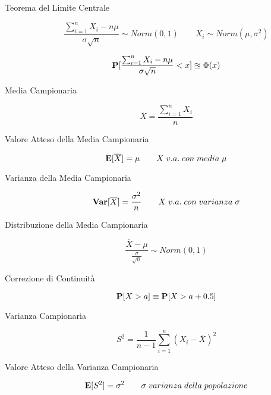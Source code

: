 \begin{description}
	
	\item[Teorema del Limite Centrale]
	\begin{equation}
	\frac{\sum_{i=1}^{n} X_{i} - n\mu}{\sigma\sqrt{n}} \sim Norm(0,1) \qquad X_{i} \sim Norm(\mu,\sigma^{2}) 
	\end{equation}
	
	\begin{equation}
	\mathbf{P}[\frac{\sum_{i=1}^{n} X_{i} - n\mu}{\sigma\sqrt{n}} < x] \approxeq \Phi(x)
	\end{equation}
	
	\item[Media Campionaria]
	\begin{equation}
	\overline{X} = \frac{\sum_{i=1}^{n} X_{i}}{n}
	\end{equation}
	
	\item[Valore Atteso della Media Campionaria]
	\begin{equation}
	\mathbf{E}[\overline{X}] = \mu \qquad X \; v.a. \; con \; media \; \mu
	\end{equation}
	
	\item[Varianza della Media Campionaria]
	\begin{equation}
	\mathbf{Var}[\overline{X}] = \frac{\sigma^{2}}{n} \qquad X \; v.a. \; con \; varianza \; \sigma
	\end{equation}
	
	\item[Distribuzione della Media Campionaria]
	\begin{equation}
	\frac{\overline{X}-\mu}{\frac{\sigma}{\sqrt{n}}} \sim Norm(0,1)
	\end{equation}
	
	\item[Correzione di Continuità]
	\begin{equation}
	\mathbf{P}[X > a] \equiv \mathbf{P}[X > a+0.5]
	\end{equation}
	
	\item[Varianza Campionaria]
	\begin{equation}
	S^{2} = \frac{1}{n-1}\sum_{i=1}^{n} (X_{i}-\overline{X})^{2}
	\end{equation}
	
	\item[Valore Atteso della Varianza Campionaria]
	\begin{equation}
	\mathbf{E}[S^{2}] = \sigma^{2} \qquad \sigma \; varianza \; della \; popolazione
	\end{equation}
	

\end{description}
